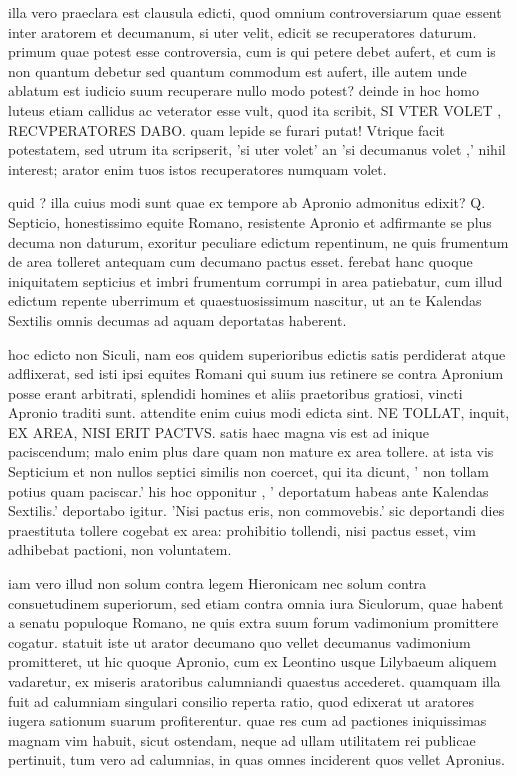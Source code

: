  illa vero praeclara est clausula edicti, quod omnium controversiarum quae essent inter aratorem et decumanum, si uter velit, edicit se recuperatores daturum. primum quae potest esse controversia, cum is qui petere debet aufert, et cum is non quantum debetur sed quantum commodum est aufert, ille autem unde ablatum est iudicio suum recuperare nullo modo potest? deinde in hoc homo luteus etiam callidus ac veterator esse vult, quod ita scribit, SI VTER VOLET , RECVPERATORES DABO. quam lepide se furari putat! Vtrique facit potestatem, sed utrum ita scripserit, 'si uter volet' an 'si decumanus volet ,' nihil interest; arator enim tuos istos recuperatores numquam volet.

 quid ? illa cuius modi sunt quae ex tempore ab Apronio admonitus edixit? Q. Septicio, honestissimo equite Romano, resistente Apronio et adfirmante se plus decuma non daturum, exoritur peculiare edictum repentinum, ne quis frumentum de area tolleret antequam cum decumano pactus esset. ferebat hanc quoque iniquitatem septicius et imbri frumentum corrumpi in area patiebatur, cum illud edictum repente uberrimum et quaestuosissimum nascitur, ut an te Kalendas Sextilis omnis decumas ad aquam deportatas haberent.

 hoc edicto non Siculi, nam eos quidem superioribus edictis satis perdiderat atque adflixerat, sed isti ipsi equites Romani qui suum ius retinere se contra Apronium posse erant arbitrati, splendidi homines et aliis praetoribus gratiosi, vincti Apronio traditi sunt. attendite enim cuius modi edicta sint. NE TOLLAT, inquit, EX AREA, NISI ERIT PACTVS. satis haec magna vis est ad inique paciscendum; malo enim plus dare quam non mature ex area tollere. at ista vis Septicium et non nullos septici similis non coercet, qui ita dicunt, ' non tollam potius quam paciscar.' his hoc opponitur , ' deportatum habeas ante Kalendas Sextilis.' deportabo igitur. 'Nisi pactus eris, non commovebis.' sic deportandi dies praestituta tollere cogebat ex area: prohibitio tollendi, nisi pactus esset, vim adhibebat pactioni, non voluntatem.

 iam vero illud non solum contra legem Hieronicam nec solum contra consuetudinem superiorum, sed etiam contra omnia iura Siculorum, quae habent a senatu populoque Romano, ne quis extra suum forum vadimonium promittere cogatur. statuit iste ut arator decumano quo vellet decumanus vadimonium promitteret, ut hic quoque Apronio, cum ex Leontino usque Lilybaeum aliquem vadaretur, ex miseris aratoribus calumniandi quaestus accederet. quamquam illa fuit ad calumniam singulari consilio reperta ratio, quod edixerat ut aratores iugera sationum suarum profiterentur. quae res cum ad pactiones iniquissimas magnam vim habuit, sicut ostendam, neque ad ullam utilitatem rei publicae pertinuit, tum vero ad calumnias, in quas omnes inciderent quos vellet Apronius.

